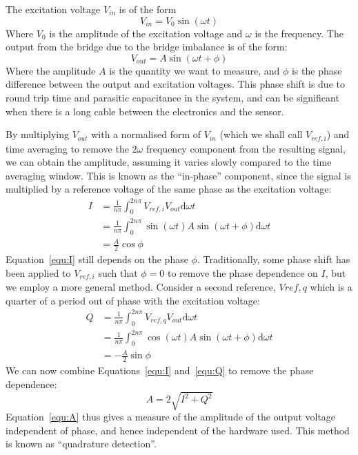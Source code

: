 \documentclass[12pt,a4paper]{article}
\begin{document}
The excitation voltage $V_{in}$ is of the form
\begin{equation}
  \label{equ:vin}
  V_{in} = V_0\sin(\omega t)
\end{equation}
Where $V_0$ is the amplitude of the excitation voltage and $\omega$ is the frequency. The output from the bridge due to the bridge imbalance is of the form:
\begin{equation}
  \label{equ:vout}
  V_{out} = A\sin(\omega t + \phi)
\end{equation}
Where the amplitude $A$ is the quantity we want to measure, and $\phi$ is the phase difference between the output and excitation voltages. This phase
shift is due to round trip time and parasitic capacitance in the system, and can be significant when there is a long cable between the electronics and
the sensor.

By multiplying $V_{out}$ with a normalised form of $V_{in}$ (which we shall call $V_{ref,i}$) and time averaging to remove the $2\omega$ frequency component
from the resulting signal, we can obtain the amplitude, assuming it varies slowly compared to the time averaging window. This is known as the ``in-phase''
component, since the signal is multiplied by a reference voltage of the same phase as the excitation voltage:
\begin{equation}
  \label{equ:I}
  \begin{split}
  I &= \frac{1}{n\pi}\int_{0}^{2n\pi}V_{ref,i}V_{out}\mathrm{d}\omega t \\
  &= \frac{1}{n\pi}\int_{0}^{2n\pi}\sin(\omega t) A \sin(\omega t + \phi)\mathrm{d}\omega t \\
  &= \frac{A}{2}\cos \phi
  \end{split}
\end{equation}
Equation~\ref{equ:I} still depends on the phase $\phi$. Traditionally, some phase shift has been applied to $V_{ref,i}$ such that $\phi = 0$ to remove the
phase dependence on $I$, but we employ a more general method. Consider a second reference, $V{ref,q}$ which is a quarter of a period out of phase with the
excitation voltage:
\begin{equation}
  \label{equ:Q}
  \begin{split}
  Q &= \frac{1}{n\pi}\int_{0}^{2n\pi}V_{ref,q}V_{out}\mathrm{d}\omega t \\
  &= \frac{1}{n\pi}\int_{0}^{2n\pi}\cos(\omega t) A \sin(\omega t + \phi)\mathrm{d}\omega t \\
  &= -\frac{A}{2}\sin \phi
  \end{split}
\end{equation}
We can now combine Equations~\ref{equ:I} and~\ref{equ:Q} to remove the phase dependence:
\begin{equation}
  \label{equ:A}
  A = 2\sqrt{I^2 + Q^2}
\end{equation}
Equation~\ref{equ:A} thus gives a measure of the amplitude of the output voltage independent of phase, and hence independent of the hardware used. This
method is known as ``quadrature detection''.
\end{document}
